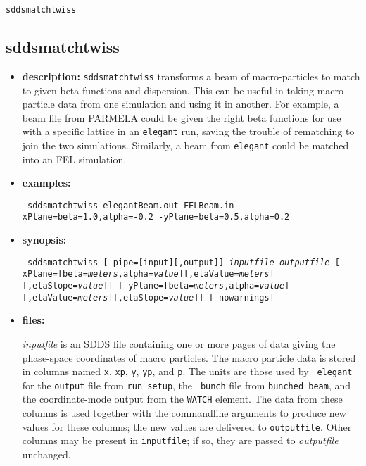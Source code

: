 \documentclass[11pt]{article}
\begin{document}
\begin{latexonly}
\newpage
\begin{center}{\Large\verb|sddsmatchtwiss|}\end{center}
\end{latexonly}
\subsection{sddsmatchtwiss}
\label{sddsmatchtwiss}

\begin{itemize}
\item {\bf description:} 
{\tt sddsmatchtwiss} transforms a beam of macro-particles to match to given beta
functions and dispersion.   This can be useful in taking macro-particle data from
one simulation and using it in another.  For example, a beam file from PARMELA
could be given the right beta functions for use with a specific lattice in an
{\tt elegant} run, saving the trouble of rematching to join the two simulations.
Similarly, a beam from {\tt elegant} could be matched into an FEL simulation.

\item {\bf examples:}
\begin{flushleft}{\tt
sddsmatchtwiss elegantBeam.out FELBeam.in -xPlane=beta=1.0,alpha=-0.2 -yPlane=beta=0.5,alpha=0.2
}\end{flushleft}

\item {\bf synopsis:}
\begin{flushleft}{\tt
sddsmatchtwiss [-pipe=[input][,output]] {\em inputfile} {\em outputfile}
[-xPlane=[beta={\em meters},alpha={\em value}][,etaValue={\em meters}][,etaSlope={\em value}]]
[-yPlane=[beta={\em meters},alpha={\em value}][,etaValue={\em meters}][,etaSlope={\em value}]]
[-nowarnings]
}\end{flushleft}

\item {\bf files:}

{\em inputfile} is an SDDS file containing one or more pages of data
giving the phase-space coordinates of macro particles.  The macro
particle data is stored in columns named \verb|x|, \verb|xp|,
\verb|y|, \verb|yp|, and \verb|p|.  The units are those used by {\tt
elegant} for the {\tt output} file from {\tt run\_setup}, the {\tt
bunch} file from {\tt bunched\_beam}, and the coordinate-mode output
from the {\tt WATCH} element. The data from these columns is used
together with the commandline arguments to produce new values for
these columns; the new values are delivered to {\tt outputfile}.
Other columns may be present in {\tt inputfile}; if so, they are
passed to {\em outputfile} unchanged.


\end{itemize}
\end{document}
